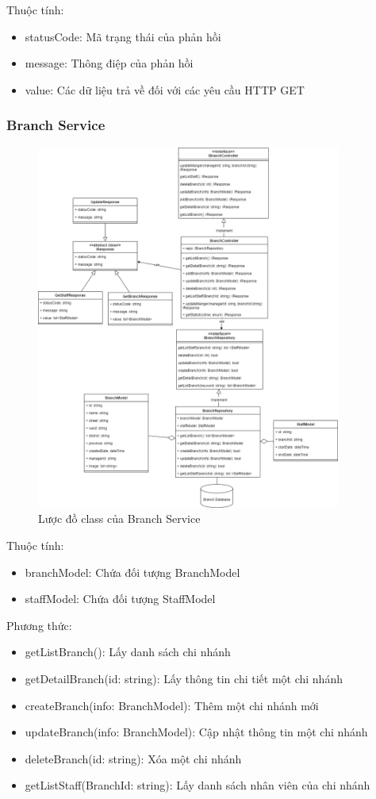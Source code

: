 Thuộc tính:
\begin{itemize}
	\item statusCode: Mã trạng thái của phản hồi
	\item message: Thông điệp của phản hồi
	\item value: Các dữ liệu trả về đối với các yêu cầu HTTP GET
\end{itemize}



\subsubsection{Branch Service}
\begin{figure}[!htp]
	\centering
	\includegraphics[width=10cm]{img/Architecture/service/BranchService.png}
	\newline
	\caption{Lược đồ class của Branch Service}
\end{figure}

Thuộc tính:
\begin{itemize}
	\item branchModel: Chứa đối tượng BranchModel
	\item staffModel: Chứa đối tượng StaffModel
\end{itemize}
Phương thức:
\begin{itemize}
	\item getListBranch(): Lấy danh sách chi nhánh
	\item getDetailBranch(id: string): Lấy thông tin chi tiết một chi nhánh
	\item createBranch(info: BranchModel): Thêm một chi nhánh mới
	\item updateBranch(info: BranchModel): Cập nhật thông tin một chi nhánh
	\item deleteBranch(id: string): Xóa một chi nhánh
	\item getListStaff(BranchId: string): Lấy danh sách nhân viên của chi nhánh
\end{itemize}

